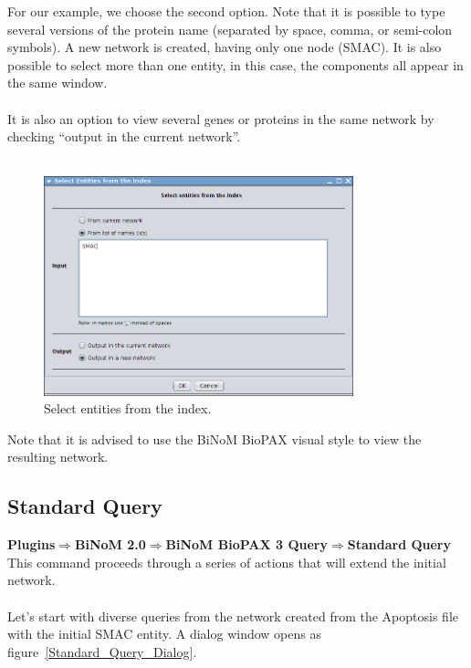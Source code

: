 For our example, we choose the second option. Note that it is possible to type
several versions of the protein name (separated by space, comma, or semi-colon
symbols). A new network is created, having only one node (SMAC). It is also
possible to select more than one entity, in this case, the components all appear
in the same window.\\\\

It is also an option to view several genes or proteins in the same network by
checking “output in the current network”.\\\\

\begin{figure}
\centering
\includegraphics[width=0.8\textwidth]{graphics/ebo_select_entities_from_the_index}
\caption{Select entities from the index.}
\label{Select_entities_from_index}
\end{figure}

Note that it is advised to use the BiNoM BioPAX visual style to view the resulting network.

\subsection{Standard Query}
\textbf{Plugins$\Rightarrow$BiNoM 2.0$\Rightarrow$BiNoM BioPAX 3 Query$\Rightarrow$Standard Query}\\

This command proceeds through a series of actions that will extend the initial
network.\\\\
Let’s start with diverse queries from the network created from the Apoptosis
file with the initial SMAC entity. A dialog window opens as
figure~\ref{Standard_Query_Dialog}.\\\\

